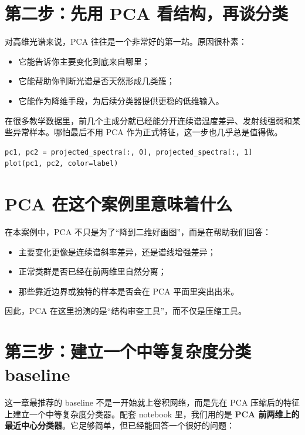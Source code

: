 \section{第二步：先用 PCA 看结构，再谈分类}

对高维光谱来说，PCA 往往是一个非常好的第一站。原因很朴素：

\begin{itemize}
    \item 它能告诉你主要变化到底来自哪里；
    \item 它能帮助你判断光谱是否天然形成几类簇；
    \item 它能作为降维手段，为后续分类器提供更稳的低维输入。
\end{itemize}

在很多教学数据里，前几个主成分就已经能分开连续谱温度差异、发射线强弱和某些异常样本。哪怕最后不用 PCA 作为正式特征，这一步也几乎总是值得做。

\begin{examplebox}
\begin{lstlisting}[style=pythonstyle]
pc1, pc2 = projected_spectra[:, 0], projected_spectra[:, 1]
plot(pc1, pc2, color=label)
\end{lstlisting}
\end{examplebox}

\section{PCA 在这个案例里意味着什么}

在本案例中，PCA 不只是为了“降到二维好画图”，而是在帮助我们回答：

\begin{itemize}
    \item 主要变化更像是连续谱斜率差异，还是谱线增强差异；
    \item 正常类群是否已经在前两维里自然分离；
    \item 那些靠近边界或独特的样本是否会在 PCA 平面里突出出来。
\end{itemize}

因此，PCA 在这里扮演的是“结构审查工具”，而不仅是压缩工具。

\section{第三步：建立一个中等复杂度分类 baseline}

这一章最推荐的 baseline 不是一开始就上卷积网络，而是先在 PCA 压缩后的特征上建立一个中等复杂度分类器。配套 notebook 里，我们用的是 \textbf{PCA 前两维上的最近中心分类器}。它足够简单，但已经能回答一个很好的问题：

